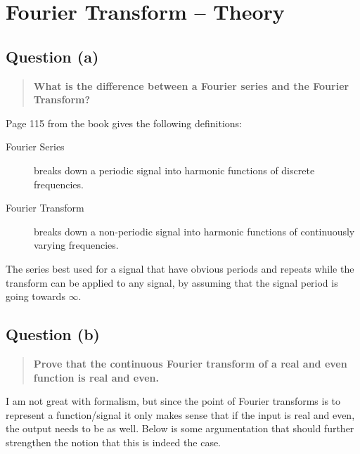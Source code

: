 \section{Fourier Transform – Theory}
\subsection{Question (a)}
\begin{quote}
  \textbf{What is the difference between a Fourier series and the Fourier
    Transform?}
\end{quote}


\noindent Page 115 from the book gives the following definitions:
\begin{description}
\item[Fourier Series] breaks down a periodic signal into harmonic functions of
  discrete frequencies.
\item[Fourier Transform] breaks down a non-periodic signal into harmonic
  functions of continuously varying frequencies.
\end{description}

The series best used for a signal that have obvious periods and repeats while
the transform can be applied to any signal, by assuming that the signal period
is going towards $\infty$.

\subsection{Question (b)}
\begin{quote}
  \textbf{Prove that the continuous Fourier transform of a real and even
    function is real and even.}
\end{quote}

I am not great with formalism, but since the point of Fourier transforms is to
represent a function/signal it only makes sense that if the input is real and
even, the output needs to be as well. Below is some argumentation that should
further strengthen the notion that this is indeed the case.



